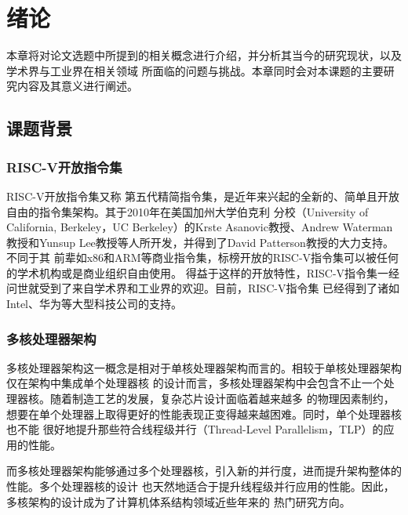 
\section{绪论}

本章将对论文选题中所提到的相关概念进行介绍，并分析其当今的研究现状，以及学术界与工业界在相关领域
所面临的问题与挑战。本章同时会对本课题的主要研究内容及其意义进行阐述。

\subsection{课题背景}

\subsubsection{RISC-V开放指令集}
\label{section:background_riscv}

RISC-V开放指令集\cite{waterman2016design, waterman2014risc, waterman2015risc}又称
第五代精简指令集，是近年来兴起的全新的、简单且开放自由的指令集架构。其于2010年在美国加州大学伯克利
分校（University of California, Berkeley，UC Berkeley）的Krste Asanovic教授、Andrew
Waterman教授和Yunsup Lee教授等人所开发，并得到了David Patterson教授的大力支持。不同于其
前辈如x86和ARM等商业指令集，标榜开放的RISC-V指令集可以被任何的学术机构或是商业组织自由使用。
得益于这样的开放特性，RISC-V指令集一经问世就受到了来自学术界和工业界的欢迎。目前，RISC-V指令集
已经得到了诸如Intel、华为等大型科技公司的支持\cite{riscvmember}。

\subsubsection{多核处理器架构}
\label{section:background_manycore}

多核处理器架构这一概念是相对于单核处理器架构而言的。相较于单核处理器架构仅在架构中集成单个处理器核
的设计而言，多核处理器架构中会包含不止一个处理器核。随着制造工艺的发展，复杂芯片设计面临着越来越多
的物理因素制约，想要在单个处理器上取得更好的性能表现正变得越来越困难。同时，单个处理器核也不能
很好地提升那些符合线程级并行（Thread-Level Parallelism，TLP）的应用的性能。

而多核处理器架构能够通过多个处理器核，引入新的并行度，进而提升架构整体的性能。多个处理器核的设计
也天然地适合于提升线程级并行应用的性能。因此，多核架构的设计成为了计算机体系结构领域近些年来的
热门研究方向。

